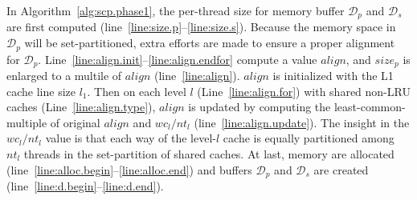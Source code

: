 In Algorithm~\ref{alg:scp.phase1},
the per-thread size for memory buffer $\mathcal{D}_p$ and
$\mathcal{D}_s$ are first computed
(line~\ref{line:size.p}--\ref{line:size.s}).
Because the memory space in $\mathcal{D}_p$ will be set-partitioned,
extra efforts are made to ensure a proper alignment for $\mathcal{D}_p$.
Line~\ref{line:align.init}--\ref{line:align.endfor} compute a value $align$,
and $size_p$ is enlarged to a multile of $align$ (line~\ref{line:align}).
$align$ is initialized with the L1 cache line size $l_1$.
Then on each level $l$ (Line~\ref{line:align.for})
with shared non-LRU caches (Line~\ref{line:align.type}),
$align$ is updated by computing the least-common-multiple of
original $align$ and $wc_l/nt_l$ (line~\ref{line:align.update}).
The insight in the $wc_l/nt_l$ value is that
each way of the level-$l$ cache is equally partitioned among $nt_l$ threads
in the set-partition of shared caches.
At last, memory are allocated (line~\ref{line:alloc.begin}--\ref{line:alloc.end})
and buffers $\mathcal{D}_p$ and $\mathcal{D}_s$
are created (line~\ref{line:d.begin}--\ref{line:d.end}).

